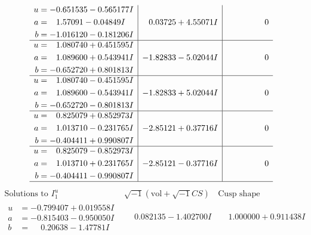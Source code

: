 \documentclass[1p]{elsarticle_modified}
\theoremstyle{definition}
\newcommand{\I}{\sqrt{-1}}
\begin{document}
$$\begin{array}{c|c|c}
\begin{aligned}
u &= -0.651535 - 0.565177 I \\
a &= \phantom{-}1.57091 - 0.04849 I \\
b &= -1.016120 - 0.181206 I\end{aligned}
 & \phantom{-}0.03725 + 4.55071 I & \phantom{-0.000000 } 0 \\ \hline\begin{aligned}
u &= \phantom{-}1.080740 + 0.451595 I \\
a &= \phantom{-}1.089600 + 0.543941 I \\
b &= -0.652720 + 0.801813 I\end{aligned}
 & -1.82833 - 5.02044 I & \phantom{-0.000000 } 0 \\ \hline\begin{aligned}
u &= \phantom{-}1.080740 - 0.451595 I \\
a &= \phantom{-}1.089600 - 0.543941 I \\
b &= -0.652720 - 0.801813 I\end{aligned}
 & -1.82833 + 5.02044 I & \phantom{-0.000000 } 0 \\ \hline\begin{aligned}
u &= \phantom{-}0.825079 + 0.852973 I \\
a &= \phantom{-}1.013710 - 0.231765 I \\
b &= -0.404411 + 0.990807 I\end{aligned}
 & -2.85121 + 0.37716 I & \phantom{-0.000000 } 0 \\ \hline\begin{aligned}
u &= \phantom{-}0.825079 - 0.852973 I \\
a &= \phantom{-}1.013710 + 0.231765 I \\
b &= -0.404411 - 0.990807 I\end{aligned}
 & -2.85121 - 0.37716 I & \phantom{-0.000000 } 0\\
 \hline 
 \end{array}$$\newpage$$\begin{array}{c|c|c}  
\text{Solutions to }I^u_{1}& \I (\text{vol} + \sqrt{-1}CS) & \text{Cusp shape}\\
 \hline 
\begin{aligned}
u &= -0.799407 + 0.019558 I \\
a &= -0.815403 - 0.950050 I \\
b &= \phantom{-}0.20638 - 1.47781 I\end{aligned}
 & \phantom{-}0.082135 - 1.402700 I & \phantom{-}1.000000 + 0.911438 I \\ \hline\begin{aligned}

\end{aligned}
\end{array}$$
\end{document}
